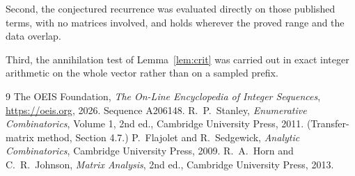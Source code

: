 \documentclass[11pt,a4paper]{article}
\theoremstyle{plain}
\theoremstyle{definition}
\begin{document}
Second, the conjectured recurrence was evaluated directly on those published terms, with no
matrices involved, and holds wherever the proved range and the data overlap.

Third, the annihilation test of Lemma~\ref{lem:crit} was carried out in exact integer
arithmetic on the whole vector rather than on a sampled prefix.

\begin{thebibliography}{9}
 The OEIS Foundation, \emph{The On-Line Encyclopedia of Integer
Sequences}, \url{https://oeis.org}, 2026. Sequence A206148.
 R.~P.~Stanley, \emph{Enumerative Combinatorics}, Volume 1, 2nd ed.,
Cambridge University Press, 2011. (Transfer-matrix method, Section 4.7.)
 P.~Flajolet and R.~Sedgewick, \emph{Analytic Combinatorics}, Cambridge
University Press, 2009.
 R.~A.~Horn and C.~R.~Johnson, \emph{Matrix Analysis}, 2nd ed., Cambridge
University Press, 2013.
\end{thebibliography}
\end{document}
